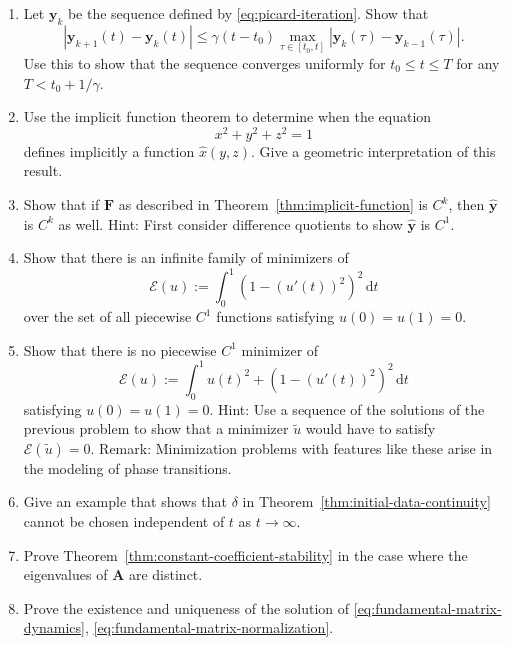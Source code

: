 \begin{enumerate}[label=\thesection.\arabic*.,ref=\thesection.\arabic*,series=book-problems]

\item\label{ex:picard-uniform-convergence} Let $\bm{y}_k$ be the sequence defined by \eqref{eq:picard-iteration}. Show that
\[
|\bm{y}_{k+1}(t)-\bm{y}_k(t)|\leq\gamma(t-t_0)\max_{\tau\in[t_0,t]}|\bm{y}_k(\tau)-\bm{y}_{k-1}(\tau)|.
\]
Use this to show that the sequence converges uniformly for $t_0\leq t\leq T$ for any $T<t_0+1/\gamma$.

\item\label{ex:sphere-implicit-function} Use the implicit function theorem to determine when the equation
\[
x^2+y^2+z^2=1
\]
defines implicitly a function $\hat{x}(y,z)$. Give a geometric interpretation of this result.

\item\label{ex:implicit-function-regularity} Show that if $\bm{F}$ as described in Theorem~\ref{thm:implicit-function} is $C^k$, then $\hat{\bm{y}}$ is $C^k$ as well. Hint: First consider difference quotients to show $\hat{\bm{y}}$ is $C^1$.

\item\label{ex:nonunique-minimizers} Show that there is an infinite family of minimizers of
\[
\mathcal{E}(u):=\int_0^1(1-(u'(t))^2)^2\,\mathrm{d}t
\]
over the set of all piecewise $C^1$ functions satisfying $u(0)=u(1)=0$.

\item\label{ex:nonattained-minimum} Show that there is no piecewise $C^1$ minimizer of
\[
\mathcal{E}(u):=\int_0^1u(t)^2+(1-(u'(t))^2)^2\,\mathrm{d}t
\]
satisfying $u(0)=u(1)=0$. Hint: Use a sequence of the solutions of the previous problem to show that a minimizer $\tilde{u}$ would have to satisfy $\mathcal{E}(\tilde{u})=0$. Remark: Minimization problems with features like these arise in the modeling of phase transitions.

\item\label{ex:nonuniform-initial-data-continuity} Give an example that shows that $\delta$ in Theorem~\ref{thm:initial-data-continuity} cannot be chosen independent of $t$ as $t\to\infty$.

\item\label{ex:distinct-eigenvalue-stability} Prove Theorem~\ref{thm:constant-coefficient-stability} in the case where the eigenvalues of $\bm{A}$ are distinct.

\item\label{ex:fundamental-matrix-existence} Prove the existence and uniqueness of the solution of \eqref{eq:fundamental-matrix-dynamics}, \eqref{eq:fundamental-matrix-normalization}.


\end{enumerate}

